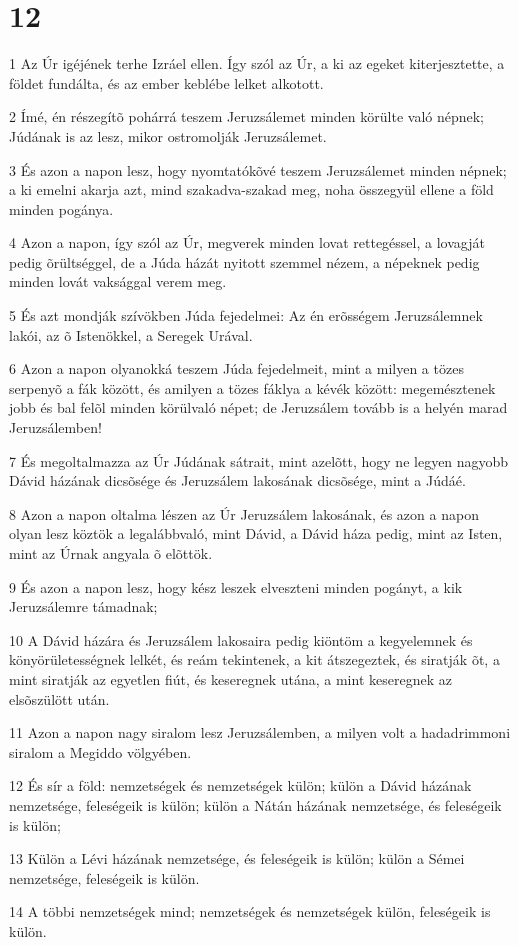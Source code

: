 \chapter{12}

\par 1 Az Úr igéjének terhe Izráel ellen. Így szól az Úr, a ki az egeket kiterjesztette, a földet fundálta, és az ember keblébe lelket alkotott.
\par 2 Ímé, én részegítõ pohárrá teszem Jeruzsálemet minden körülte való népnek; Júdának is az lesz, mikor ostromolják Jeruzsálemet.
\par 3 És azon a napon lesz, hogy nyomtatókõvé teszem Jeruzsálemet minden népnek; a ki emelni akarja azt, mind szakadva-szakad meg, noha összegyül ellene a föld minden pogánya.
\par 4 Azon a napon, így szól az Úr, megverek minden lovat rettegéssel, a lovagját pedig õrültséggel, de a Júda házát nyitott szemmel nézem, a népeknek pedig minden lovát vaksággal verem meg.
\par 5 És azt mondják szívökben Júda fejedelmei: Az én erõsségem Jeruzsálemnek lakói, az õ Istenökkel, a Seregek Urával.
\par 6 Azon a napon olyanokká teszem Júda fejedelmeit, mint a milyen a tözes serpenyõ a fák között, és amilyen a tözes fáklya a kévék között: megemésztenek jobb és bal felõl minden körülvaló népet; de Jeruzsálem tovább is a helyén marad Jeruzsálemben!
\par 7 És megoltalmazza az Úr Júdának sátrait, mint azelõtt, hogy ne legyen nagyobb Dávid házának dicsõsége és Jeruzsálem lakosának dicsõsége, mint a Júdáé.
\par 8 Azon a napon oltalma lészen az Úr Jeruzsálem lakosának, és azon a napon olyan lesz köztök a legalábbvaló, mint Dávid, a Dávid háza pedig, mint az Isten, mint az Úrnak angyala õ elõttök.
\par 9 És azon a napon lesz, hogy kész leszek elveszteni minden pogányt, a kik Jeruzsálemre támadnak;
\par 10 A Dávid házára és Jeruzsálem lakosaira pedig kiöntöm a kegyelemnek és könyörületességnek lelkét, és reám tekintenek, a kit átszegeztek, és siratják õt, a mint siratják az egyetlen fiút, és keseregnek utána, a mint keseregnek az elsõszülött  után.
\par 11 Azon a napon nagy siralom lesz Jeruzsálemben, a milyen volt a hadadrimmoni siralom a Megiddo völgyében.
\par 12 És sír a föld: nemzetségek és nemzetségek külön; külön a Dávid házának nemzetsége, feleségeik is külön; külön a Nátán házának nemzetsége, és feleségeik is külön;
\par 13 Külön a Lévi házának nemzetsége, és feleségeik is külön; külön a Sémei nemzetsége, feleségeik is külön.
\par 14 A többi nemzetségek mind; nemzetségek és nemzetségek külön, feleségeik is külön.

